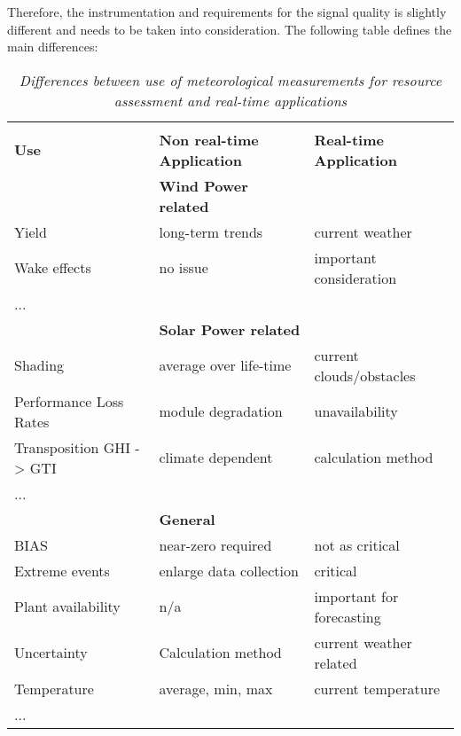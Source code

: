 Therefore, the instrumentation and requirements for the signal quality is slightly different and needs to be taken into consideration. The following table defines the main differences:

\begin{table}[h!]
\begin{center}
 \begin{tabular}{|| l l l ||}
 \hline\hline
  & & \\ 
\textbf{Use} & \textbf{Non real-time Application} & \textbf{Real-time Application} \\ 
 \hline \hline
& \textbf{Wind Power related} & \\\hline \hline
Yield & long-term trends & current weather \\
Wake effects & no issue & important consideration \\
... & & \\ \hline \hline
& \textbf{Solar Power related} & \\ \hline \hline
Shading & average over life-time & current clouds/obstacles\\ 
Performance Loss Rates & module degradation & unavailability \\
Transposition GHI -> GTI & climate dependent & calculation method \\
... & & \\ \hline \hline
& \textbf{General}  & \\ \hline \hline
BIAS & near-zero required & not as critical \\
Extreme events & enlarge data collection & critical \\
Plant availability & n/a & important for forecasting \\
Uncertainty & Calculation method & current weather related \\
Temperature & average, min, max & current temperature\\
... & & \\ \hline \hline
\end{tabular}
\caption{\textit{Differences between use of meteorological measurements for resource assessment and real-time applications}}
\label{tab:qlimit}
\end{center}
\end{table}


